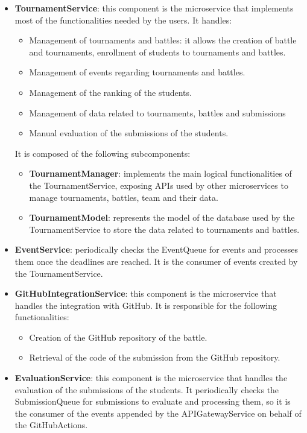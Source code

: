 \begin{itemize}
\begin{itemize}
    \end{itemize}
    \item \textbf{TournamentService}: this component is the microservice that implements most of the functionalities needed by the users. It handles:
    \begin{itemize}
        \item Management of tournaments and battles: it allows the creation of battle and tournaments, enrollment of students to tournaments and battles.
        \item Management of events regarding tournaments and battles.
        \item Management of the ranking of the students.
        \item Management of data related to tournaments, battles and submissions
        \item Manual evaluation of the submissions of the students.
    \end{itemize}
    It is composed of the following subcomponents:
    \begin{itemize}
        \item \textbf{TournamentManager}: implements the main logical functionalities of the TournamentService, exposing APIs used by other microservices to manage tournaments, battles, team and their data.
        \item \textbf{TournamentModel}: represents the model of the database used by the TournamentService to store the data related to tournaments and battles.
    \end{itemize}
    \item \textbf{EventService}: periodically checks the EventQueue for events and processes them once the deadlines are reached. It is the consumer of events created by the TournamentService.
    \item \textbf{GitHubIntegrationService}: this component is the microservice that handles the integration with GitHub. It is responsible for the following functionalities:
    \begin{itemize}
        \item Creation of the GitHub repository of the battle.
        \item Retrieval of the code of the submission from the GitHub repository.
    \end{itemize}
    \item \textbf{EvaluationService}: this component is the microservice that handles the evaluation of the submissions of the students. It periodically checks the SubmissionQueue for submissions to evaluate and processing them, so it is the consumer of the events appended by the APIGatewayService on behalf of the GitHubActions.

\end{itemize}
